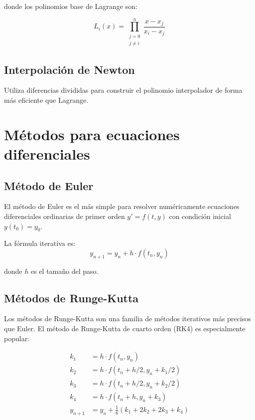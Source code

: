 \documentclass[12pt,a4paper]{article}
\begin{document}
donde los polinomios base de Lagrange son:

\begin{equation}
    L_i(x) = \prod_{\substack{j=0\\j\neq i}}^{n} \frac{x - x_j}{x_i - x_j}
\end{equation}

\subsection{Interpolación de Newton}

Utiliza diferencias divididas para construir el polinomio interpolador de forma más eficiente que Lagrange.

\section{Métodos para ecuaciones diferenciales}

\subsection{Método de Euler}

El método de Euler es el más simple para resolver numéricamente ecuaciones diferenciales ordinarias de primer orden $y' = f(t, y)$ con condición inicial $y(t_0) = y_0$.

La fórmula iterativa es:
\begin{equation}
    y_{n+1} = y_n + h \cdot f(t_n, y_n)
\end{equation}

donde $h$ es el tamaño del paso.

\subsection{Métodos de Runge-Kutta}

Los métodos de Runge-Kutta son una familia de métodos iterativos más precisos que Euler. El método de Runge-Kutta de cuarto orden (RK4) es especialmente popular:

\begin{align}
    k_1 &= h \cdot f(t_n, y_n) \\
    k_2 &= h \cdot f(t_n + h/2, y_n + k_1/2) \\
    k_3 &= h \cdot f(t_n + h/2, y_n + k_2/2) \\
    k_4 &= h \cdot f(t_n + h, y_n + k_3) \\
    y_{n+1} &= y_n + \frac{1}{6}(k_1 + 2k_2 + 2k_3 + k_4)
\end{align}
\end{document}
